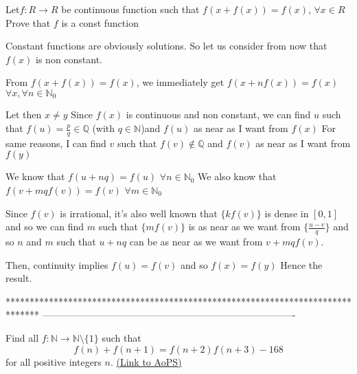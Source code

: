 \begin{solution}
	\begin{tcolorbox}Let$ f: R \to R$ be continuous function such that $ f(x + f(x)) = f(x)$, $ \forall x \in R$
Prove that $ f$ is a const function\end{tcolorbox}

Constant functions are obviously solutions. So let us consider from now that $ f(x)$ is non constant.

From $ f(x+f(x))=f(x)$, we immediately get $ f(x+nf(x))=f(x)$ $ \forall x,\forall n\in\mathbb N_0$

Let then $ x\ne y$
Since $ f(x)$ is continuous and non constant, we can find $ u$ such that $ f(u)=\frac pq\in\mathbb Q$ (with $ q\in\mathbb N$)and $ f(u)$ as near as I want from $ f(x)$
For same reasons, I can find $ v$ such that $ f(v)\notin\mathbb Q$ and $ f(v)$ as near as I want from $ f(y)$

We know that $ f(u+nq)=f(u)$ $ \forall n\in\mathbb N_0$
We also know that $ f(v+mqf(v))=f(v)$ $ \forall m\in\mathbb N_0$

Since $ f(v)$ is irrational, it's also well known that $ \{kf(v)\}$ is dense in $ [0,1]$ and so we can find $ m$ such that $ \{mf(v)\}$ is as near as we want from $ \{\frac{u-v}q\}$ and so $ n$ and $ m$ such that $ u+nq$ can be as near as we want from  $ v+mqf(v)$.

Then, continuity implies $ f(u)=f(v)$ and so $ f(x)=f(y)$
Hence the result.
\end{solution}
*******************************************************************************
-------------------------------------------------------------------------------

\begin{problem}
	Find all $f: \mathbb N \to \mathbb N \setminus \{1\}$ such that
\[f(n)+f(n+1)=f(n+2)f(n+3)-168\]
for all positive integers $n$.
	\flushright \href{https://artofproblemsolving.com/community/c6h311579}{(Link to AoPS)}
\end{problem}



